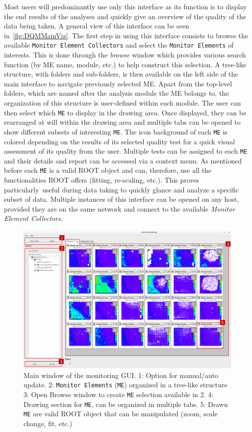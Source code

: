 \documentclass{webofc}
\begin{document}
Most users will predominantly use only this interface as its function is to display the end results of the analyses and quickly give an overview of the quality of the data being taken.
A general view of this interface can be seen in~\autoref{fig:DQMMainViz}.
The first step in using this interface consists to browse the available \texttt{Monitor Element Collectors} and select the \texttt{Monitor Elements} of interests.
This is done through the \textit{browse} window which provides various search function (by ME name, module, etc.) to help construct this selection.
A tree-like structure, with folders and sub-folders, is then available on the left side of the main interface to navigate previously selected ME.
Apart from the top-level folders, which are named after the analysis module the ME belongs to, the organization of this structure is user-defined within each module.
The user can then select which \texttt{ME} to display in the drawing area.
Once displayed, they can be rearranged at will within the drawing area and multiple tabs can be opened to show different subsets of interesting \texttt{ME}.
The icon background of each \texttt{ME} is colored depending on the results of its selected quality test for a quick visual assessment of its quality from the user.
Multiple tests can be assigned to each \texttt{ME} and their details and report can be accessed via a context menu.
As mentioned before each \texttt{ME} is a valid ROOT object and can, therefore, use all the functionalities ROOT offers (fitting, re-scaling, etc.).
This proves particularly useful during data taking to quickly glance and analyze a specific subset of data.
Multiple instances of this interface can be opened on any host, provided they are on the same network and connect to the available \textit{Monitor Element Collectors}.

\begin{figure}
  \centering
  \includegraphics[width=.95\textwidth]{figs/MaintInterfaceGUI.pdf}
    \caption{\label{fig:DQMMainViz} Main window of the monitoring GUI.
    1: Option for manual/auto update.
    2: \texttt{Monitor Elements} (\texttt{ME}) organized in a tree-like structure
    3: Open Browse window to create \texttt{ME} selection available in 2.
    4: Drawing section for \texttt{ME}, can be organized in multiple tabs.
    5: Drawn \texttt{ME} are valid ROOT object that can be manipulated (zoom, scale change, fit, etc.)
    }
\end{figure}
\end{document}
